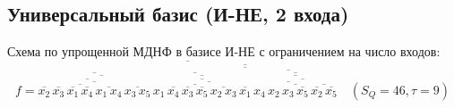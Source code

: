 \documentclass{article}
\begin{document}
\subsection*{Универсальный базис (И-НЕ, 2 входа)}
Схема по упрощенной МДНФ в базисе И-НЕ с ограничением на число входов:
\[f = \overline{\overline{\overline{x_{2}} \, \overline{\overline{\overline{x_{3}} \, \overline{\overline{\overline{x_{1}} \, \overline{x_{4}}} \, \overline{x_{1} \, x_{4}}}} \, \overline{x_{3} \, x_{5}}}} \, \overline{\overline{\overline{x_{1} \, \overline{\overline{\overline{x_{4}} \, \overline{\overline{\overline{x_{3}} \, \overline{x_{5}}} \, \overline{x_{2} \, x_{3}}}}}} \, \overline{\overline{x_{1}} \, \overline{\overline{x_{4} \, \overline{\overline{x_{2} \, \overline{x_{3} \, \overline{x_{5}}}} \, \overline{\overline{x_{2}} \, \overline{x_{5}}}}}}}}}}\quad(S_Q = 46, \tau = 9)\]
\end{document}

